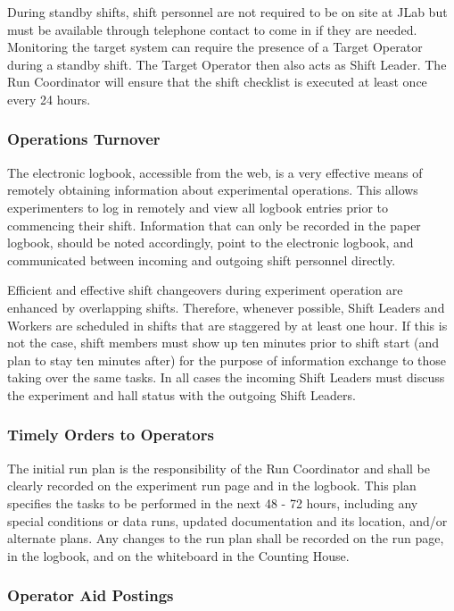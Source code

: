 \documentclass[11pt]{article}
\begin{document}
During standby shifts, shift personnel are not required to be on site at 
JLab but must be available through telephone contact to come in if they
are needed.  Monitoring the target system can require the presence of a
Target Operator during a standby shift.  The Target Operator then also
acts as Shift Leader.  The Run Coordinator will ensure that the shift
checklist is executed at least once every 24 hours.

\subsubsection{Operations Turnover}
\indent

The electronic logbook, accessible from the web, is a very effective means 
of remotely obtaining information about experimental operations. This allows 
experimenters to log in remotely and view all logbook 
entries prior to commencing their shift.
Information that can only be recorded in the paper logbook, should be
noted accordingly, point to the electronic logbook, and communicated between incoming and outgoing shift 
personnel directly.

Efficient and effective shift changeovers during experiment operation 
are enhanced by overlapping shifts. Therefore, whenever possible, Shift Leaders 
and Workers are scheduled in shifts that are staggered by at least one hour.  If this is not the case, shift members must show
up ten minutes prior to shift start (and plan to stay ten minutes after) for the
purpose of information exchange to those taking over the same tasks.
In all cases the incoming Shift Leaders must discuss the experiment and hall status with the
outgoing Shift Leaders.

\subsubsection{Timely Orders to Operators}
\indent

The initial run plan is the responsibility of the Run Coordinator and
shall be clearly recorded on the experiment run page and in the logbook. This plan specifies
the tasks to be performed in the next 48 - 72 hours, including
any special conditions or data runs, updated documentation and its
location, and/or alternate plans. Any changes to the run plan shall
be recorded on the run page, in the logbook, and on the whiteboard in the Counting House.

\subsubsection{Operator Aid Postings}
\indent
\end{document}
